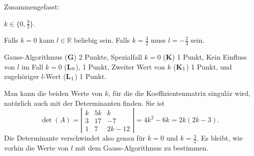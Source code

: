 \begin{loesung}
Zusammengefasst:
\begin{teilaufgaben}
\item $k\in \{0,\frac32\}$.
\item Falls $k=0$ kann $l\in\mathbb{R}$ beliebig sein. 
Falls $k=\frac32$ muss $l=-\frac23$ sein.
\qedhere
\end{teilaufgaben}
\end{loesung}

\begin{bewertung}
Gauss-Algorithmus ({\bf G}) 2 Punkte,
Spezialfall $k=0$ ({\bf K}) 1 Punkt,
Kein Einfluss von $l$ im Fall $k=0$ ({\bf L}$\mathstrut_0$), 1 Punkt,
Zweiter Wert von $k$ ({\bf K}$\mathstrut_1$) 1 Punkt,
und zugehöriger $l$-Wert ({\bf L}$\mathstrut_1$) 1 Punkt.
\end{bewertung}

\begin{diskussion}
Man kann die beiden Werte von $k$, für die die Koeffizientenmatrix
singulär wird, natürlich auch mit der Determinanten finden.
Sie ist
\[
\det(A)
=
\left|
\begin{matrix}
 k& 5k&    k  \\
 3& 17&   -7  \\
 1&  7& 2k -12
\end{matrix}
\right|
=
4k^2-6k = 2k(2k-3).
\]
Die Determinante verschwindet also genau für $k=0$ und $k=\frac32$.
Es bleibt, wie vorhin die Werte von $l$ mit dem Gauss-Algorithmus zu
bestimmen.
\end{diskussion}

